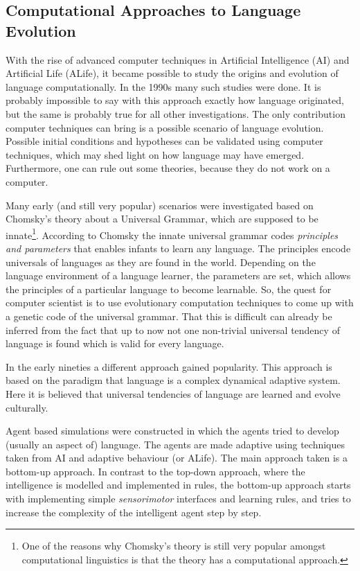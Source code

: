 \subsection{Computational Approaches to Language Evolution}

With the rise of advanced computer techniques in Artificial Intelligence (AI) and Artificial Life (ALife), it became possible to study the origins and evolution of language computationally. In the 1990s many such studies were done. It is probably impossible to say with this approach exactly how language originated, but the same is probably true for all other investigations. The only contribution computer techniques can bring is a possible scenario of language evolution. Possible initial conditions and hypotheses can be validated using computer techniques, which may shed light on how language may have emerged. Furthermore, one can rule out some theories, because they do not work on a computer.


Many early (and still very popular) scenarios were investigated based on Chomsky's theory about a Universal Grammar, which are supposed to be innate\footnote{One of the reasons why Chomsky's theory is still very popular amongst computational linguistics is that the theory has a computational approach.}. According to Chomsky the innate universal grammar codes {\em principles and parameters} that enables infants to learn any language. The principles encode universals of languages as they are found in the world. Depending on the language environment of a language learner, the parameters are set, which allows the principles of a particular language to become learnable. So, the quest for computer scientist is to use evolutionary computation techniques to come up with a genetic code of the universal grammar. That this is difficult can already be inferred from the fact that up to now not one non-trivial universal tendency of language is found which is valid for every language.

In the early nineties a different approach gained popularity. This approach is based on the paradigm that language is a complex dynamical adaptive system. Here it is believed that universal tendencies of language are learned and evolve culturally.

Agent based simulations were constructed in which the agents tried to develop (usually an aspect of) language. The agents are made adaptive using techniques taken from AI and adaptive behaviour (or ALife). The main approach taken is a bottom-up approach. In contrast to the top-down approach, where the intelligence is modelled and implemented in rules, the bottom-up approach starts with implementing simple {\em sensorimotor} interfaces and learning rules, and tries to increase the complexity of the intelligent agent step by step.

